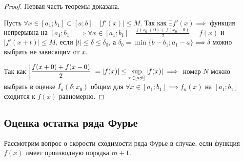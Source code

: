 \begin{proof}
    Первая часть теоремы доказана.

    Пусть $\forall x \in [a_1; b_1] \subset [a; b] \quad |f'(x)| \leq M$. Так
    как $\exists f'(x) \implies$ функция непрерывна на $[a_1; b_1] \implies
    \forall x \in [a_1; b_1] \quad \frac{f(x_0 + 0) + f(x_0 - 0)}{2} = f(x)$
    и $|f'(x + t)| \leq M$, если $|t| \leq \delta \leq \delta_0$, а
    $\delta_0 = \min \{ b - b_1; a_1 - a \} \implies \delta$ можно выбрать
    не зависящим от $x$.

    Так как $\left| \displaystyle\frac{f(x + 0) + f(x - 0)}{2} \right| = |f(x)| \leq 
    \displaystyle\sup_{x \in [a; b]} |f(x)| \implies$ номер $N$ можно выбрать в оценке
    $\overline{I_n}(\delta; x_0)$ общим для $\forall x \in [a_1; b_1] \implies
    f_n(x)$ на $[a_1; b_1]$ сходится к $f(x)$ равномерно.
\end{proof}


\subsection{Оценка остатка ряда Фурье}

Рассмотрим вопрос о скорости сходимости ряда Фурье в случае, если функция $f(x)$
имеет производную порядка $m + 1$.

